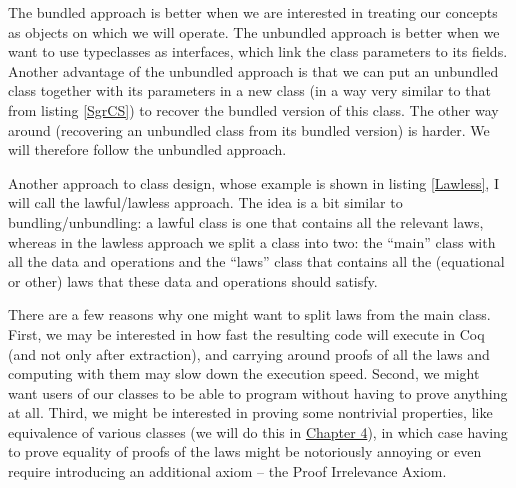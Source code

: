 \documentclass[declaration,inz,english,shortabstract]{iithesis}
\begin{document}
The bundled approach is better when we are interested in treating our concepts as objects on which we will operate. The unbundled approach is better when we want to use typeclasses as interfaces, which link the class parameters to its fields. Another advantage of the unbundled approach is that we can put an unbundled class together with its parameters in a new class (in a way very similar to that from listing \ref{SgrCS}) to recover the bundled version of this class. The other way around (recovering an unbundled class from its bundled version) is harder. We will therefore follow the unbundled approach.


Another approach to class design, whose example is shown in listing \ref{Lawless}, I will call the lawful/lawless approach. The idea is a bit similar to bundling/unbundling: a lawful class is one that contains all the relevant laws, whereas in the lawless approach we split a class into two: the ``main'' class with all the data and operations and the ``laws'' class that contains all the (equational or other) laws that these data and operations should satisfy.

There are a few reasons why one might want to split laws from the main class. First, we may be interested in how fast the resulting code will execute in Coq (and not only after extraction), and carrying around proofs of all the laws and computing with them may slow down the execution speed. Second, we might want users of our classes to be able to program without having to prove anything at all. Third, we might be interested in proving some nontrivial properties, like equivalence of various classes (we will do this in \hyperref[ch4]{Chapter 4}), in which case having to prove equality of proofs of the laws might be notoriously annoying or even require introducing an additional axiom -- the Proof Irrelevance Axiom.
\end{document}
